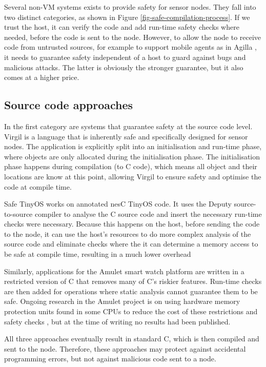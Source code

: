 Several non-VM systems exists to provide safety for sensor nodes. They fall into two distinct categories, as shown in Figure \ref{fig-safe-compilation-process}. If we trust the host, it can verify the code and add run-time safety checks where needed, before the code is sent to the node. However, to allow the node to receive code from untrusted sources, for example to support mobile agents as in Agilla \cite{Fok:2005bh}, it needs to guarantee safety independent of a host to guard against bugs and malicious attacks. The latter is obviously the stronger guarantee, but it also comes at a higher price.

\subsection{Source code approaches}
\label{sec-state-of-the-art-source-code-safety}
In the first category are systems that guarantee safety at the source code level. Virgil \cite{Titzer:2006uy} is a language that is inherently safe and specifically designed for sensor nodes. The application is explicitly split into an initialisation and run-time phase, where objects are only allocated during the initialisation phase. The initialisation phase happens during compilation (to C code), which means all object and their locations are know at this point, allowing Virgil to ensure safety and optimise the code at compile time.

Safe TinyOS \cite{Cooprider:2007ub} works on annotated nesC TinyOS code. It uses the Deputy \cite{Condit:2007uo} source-to-source compiler to analyse the C source code and insert the necessary run-time checks were necessary. Because this happens on the host, before sending the code to the node, it can use the host's resources to do more complex analysis of the source code and eliminate checks where the it can determine a memory access to be safe at compile time, resulting in a much lower overhead

Similarly, applications for the Amulet \cite{Hester:2016je} smart watch platform are written in a restricted version of C that removes many of C's riskier features. Run-time checks are then added for operations where static analysis cannot guarantee them to be safe. Ongoing research in the Amulet project is on using hardware memory protection units found in some CPUs to reduce the cost of these restrictions and safety checks \cite{Hardin:2017cq}, but at the time of writing no results had been published.

All three approaches eventually result in standard C, which is then compiled and sent to the node. Therefore, these approaches may protect against accidental programming errors, but not against malicious code sent to a node.

